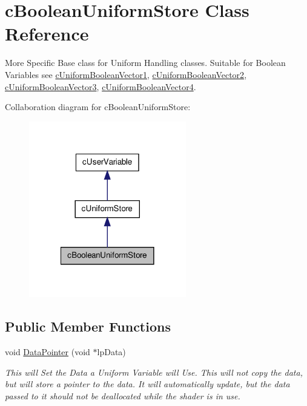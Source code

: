 \hypertarget{classc_boolean_uniform_store}{
\section{cBooleanUniformStore Class Reference}
\label{classc_boolean_uniform_store}
}


More Specific Base class for Uniform Handling classes. Suitable for Boolean Variables see \hyperlink{classc_uniform_boolean_vector1}{cUniformBooleanVector1}, \hyperlink{classc_uniform_boolean_vector2}{cUniformBooleanVector2}, \hyperlink{classc_uniform_boolean_vector3}{cUniformBooleanVector3}, \hyperlink{classc_uniform_boolean_vector4}{cUniformBooleanVector4}.  




Collaboration diagram for cBooleanUniformStore:\nopagebreak
\begin{figure}[H]
\begin{center}
\leavevmode
\includegraphics[width=194pt]{classc_boolean_uniform_store__coll__graph}
\end{center}
\end{figure}
\subsection*{Public Member Functions}
\begin{DoxyCompactItemize}
\item 
\hypertarget{classc_boolean_uniform_store_af080d19e87d31b65879ed4e2facd2330}{
void \hyperlink{classc_boolean_uniform_store_af080d19e87d31b65879ed4e2facd2330}{DataPointer} (void $\ast$lpData)}
\label{classc_boolean_uniform_store_af080d19e87d31b65879ed4e2facd2330}

\begin{DoxyCompactList}\small\item\em This will Set the Data a Uniform Variable will Use. This will not copy the data, but will store a pointer to the data. It will automatically update, but the data passed to it should not be deallocated while the shader is in use. \end{DoxyCompactList}\end{DoxyCompactItemize}


